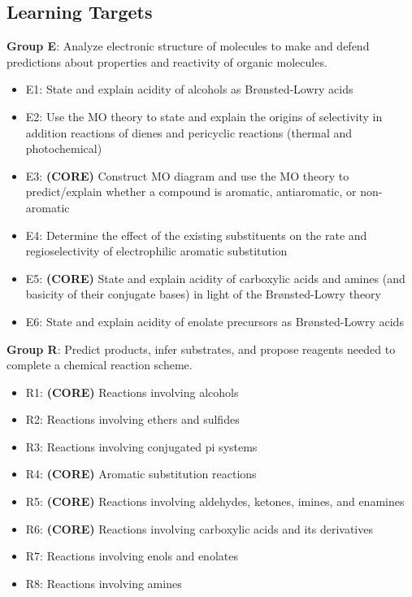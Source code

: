 \hypertarget{learning-targets}{%
\subsection{Learning Targets}\label{learning-targets}}

\textbf{Group E}: Analyze electronic structure of molecules to make and
defend predictions about properties and reactivity of organic molecules.

\begin{itemize}
\tightlist
\item
  E1: State and explain acidity of alcohols as Brønsted-Lowry acids
\item
  E2: Use the MO theory to state and explain the origins of selectivity
  in addition reactions of dienes and pericyclic reactions (thermal and
  photochemical)
\item
  E3: \textbf{(CORE)} Construct MO diagram and use the MO theory to
  predict/explain whether a compound is aromatic, antiaromatic, or
  non-aromatic
\item
  E4: Determine the effect of the existing substituents on the rate and
  regioselectivity of electrophilic aromatic substitution
\item
  E5: \textbf{(CORE)} State and explain acidity of carboxylic acids and
  amines (and basicity of their conjugate bases) in light of the
  Brønsted-Lowry theory
\item
  E6: State and explain acidity of enolate precursors as Brønsted-Lowry
  acids
\end{itemize}

\textbf{Group R}: Predict products, infer substrates, and propose
reagents needed to complete a chemical reaction scheme.

\begin{itemize}
\tightlist
\item
  R1: \textbf{(CORE)} Reactions involving alcohols
\item
  R2: Reactions involving ethers and sulfides
\item
  R3: Reactions involving conjugated pi systems
\item
  R4: \textbf{(CORE)} Aromatic substitution reactions
\item
  R5: \textbf{(CORE)} Reactions involving aldehydes, ketones, imines,
  and enamines
\item
  R6: \textbf{(CORE)} Reactions involving carboxylic acids and its
  derivatives
\item
  R7: Reactions involving enols and enolates
\item
  R8: Reactions involving amines
\end{itemize}

